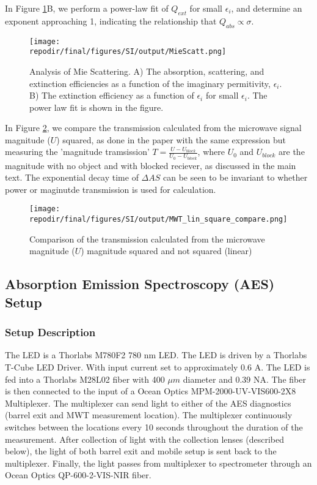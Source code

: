 In Figure \ref{fig:SI_Mie_Scattering}B, we perform a power-law fit of $Q_{ext}$ for small $\epsilon_i$, and determine an exponent approaching 1, indicating the relationship that $Q_{abs} \propto \sigma$. 


\begin{figure}[H]
\centering
\texttt{[image: \\repodir/final/figures/SI/output/MieScatt.png]}
\caption{Analysis of Mie Scattering. A) The absorption, scattering, and extinction efficiencies as a function of the imaginary permitivity, $\epsilon_i$. B) The extinction efficiency as a function of $\epsilon_i$ for small $\epsilon_i$. The power law fit is shown in the figure.}
\label{fig:SI_Mie_Scattering}
\end{figure}

In Figure \ref{fig:SI_MWT_lin_square_compare}, we compare the transmission calculated from the microwave signal magnitude ($U$) squared, as done in the paper with the same expression but measuring the 'magnitude tramsission' $T  = \frac{U - U_{block}}{U_0 - U_{block}}$, where $U_0$ and $U_{block}$ are the magnitude with no object and with blocked reciever, as discussed in the main text. The exponential decay time of $\Delta AS$ can be seen to be invariant to whether power or maginutde transmission is used for calculation. 


\begin{figure}[H]
\centering
\texttt{[image: \\repodir/final/figures/SI/output/MWT\_lin\_square\_compare.png]}
\caption{Comparison of the transmission calculated from the microwave magnitude ($U$) magnitude squared and not squared (linear)}
\label{fig:SI_MWT_lin_square_compare}
\end{figure}


\clearpage
\subsection{Absorption Emission Spectroscopy (AES) Setup}

\subsubsection{Setup Description}

The LED is a Thorlabs M780F2 780 nm LED. The LED is driven by a Thorlabs T-Cube LED Driver. With input current set to approximately 0.6 A. The LED is fed into a Thorlabs M28L02 fiber with 400 $\mu m$ diameter and 0.39 NA. The fiber is then connected to the input of a  Ocean Optics MPM-2000-UV-VIS600-2X8 Multiplexer.  The multiplexer can send light to either of the AES diagnostics (barrel exit and MWT measurement location). The multiplexer continuously switches between the locations every 10 seconds throughout the duration of the measurement. After collection of light with the collection lenses (described below), the light of both barrel exit and mobile setup is sent back to the multiplexer. Finally, the light passes from multiplexer to spectrometer through an Ocean Optics QP-600-2-VIS-NIR fiber.

